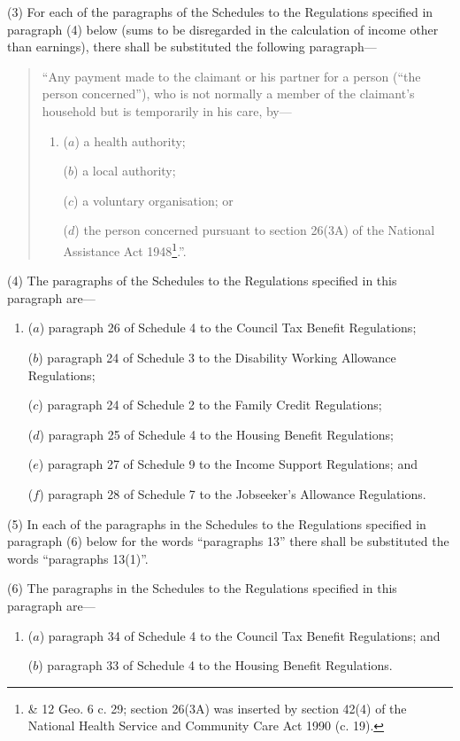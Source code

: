 \documentclass[12pt,a4paper]{article}
\begin{document}
(3) For each of the paragraphs of the Schedules to the Regulations specified in paragraph (4) below (sums to be disregarded in the calculation of income other than earnings), there shall be substituted the following paragraph—
\begin{quotation}
    “Any payment made to the claimant or his partner for a person (“the person concerned”), who is not normally a member of the claimant’s household but is temporarily in his care, by—
\begin{enumerate}\item[]
    ($a$) 
    a health authority;

    ($b$) 
    a local authority;

    ($c$) 
    a voluntary organisation; or

    ($d$) 
    the person concerned pursuant to section 26(3A) of the National Assistance Act 1948\footnote{ \& 12 Geo. 6 c. 29; section 26(3A) was inserted by section 42(4) of the National Health Service and Community Care Act 1990 (c. 19).}.”. 
\end{enumerate}
\end{quotation}

(4) The paragraphs of the Schedules to the Regulations specified in this paragraph are—
\begin{enumerate}\item[]
($a$) paragraph 26 of Schedule 4 to the Council Tax Benefit Regulations;

($b$) paragraph 24 of Schedule 3 to the Disability Working Allowance Regulations;

($c$) paragraph 24 of Schedule 2 to the Family Credit Regulations;

($d$) paragraph 25 of Schedule 4 to the Housing Benefit Regulations;

($e$) paragraph 27 of Schedule 9 to the Income Support Regulations; and

($f$) paragraph 28 of Schedule 7 to the Jobseeker’s Allowance Regulations.
\end{enumerate}

(5) In each of the paragraphs in the Schedules to the Regulations specified in paragraph (6) below for the words “paragraphs 13” there shall be substituted the words “paragraphs 13(1)”.

(6) The paragraphs in the Schedules to the Regulations specified in this paragraph are—
\begin{enumerate}\item[]
($a$) paragraph 34 of Schedule 4 to the Council Tax Benefit Regulations; and

($b$) paragraph 33 of Schedule 4 to the Housing Benefit Regulations.
\end{enumerate}
\end{document}
